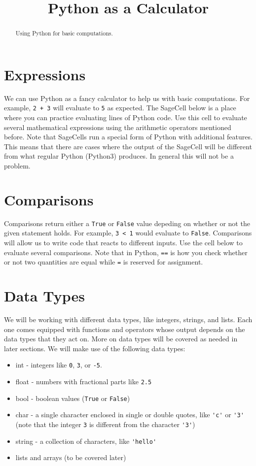 \documentclass{ximera}
\title{Python as a Calculator}
\begin{document}
  
\begin{abstract}  
Using Python for basic computations.
\end{abstract}  
\maketitle

\section{Expressions}

We can use Python as a fancy calculator to help us with basic computations. For example, \verb|2 + 3| will evaluate to \verb|5| as expected. The SageCell below is a place where you can practice evaluating lines of Python code. Use this cell to evaluate several mathematical expressions using the arithmetic operators mentioned before. Note that SageCells run a special form of Python with additional features. This means that there are cases where the output of the SageCell will be different from what regular Python (Python3) produces. In general this will not be a problem.

\section{Comparisons}

Comparisons return either a \verb|True| or \verb|False| value depeding on whether or not the given statement holds. For example, \verb|3 < 1| would evaluate to \verb|False|. Comparisons will allow us to write code that reacts to different inputs. Use the cell below to evaluate several comparisons. Note that in Python, \verb|==| is how you check whether or not two quantities are equal while \verb|=| is reserved for assignment.

\section{Data Types}

We will be working with different data types, like integers, strings, and lists. Each one comes equipped with functions and operators whose output depends on the data types that they act on. More on data types will be covered as needed in later sections. We will make use of the following data types:

\begin{itemize}
	\item int - integers like \verb|0|, \verb|3|, or \verb|-5|.
	\item float - numbers with fractional parts like \verb|2.5|
	\item bool - boolean values (\verb|True| or \verb|False|)
	\item char - a single character enclosed in single or double quotes, like \verb|'c'| or \verb|'3'| (note that the integer \verb|3| is different from the character \verb|'3'|)
	\item string - a collection of characters, like \verb|'hello'|
	\item lists and arrays (to be covered later)
\end{itemize}
\end{document}
